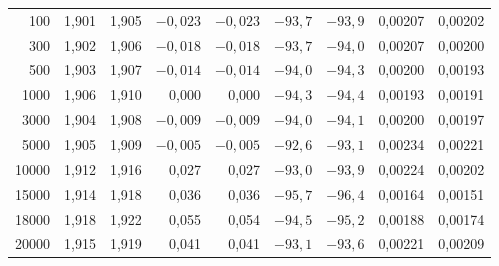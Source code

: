 \begin{table}[H]
\begin{tabular}{@{}r rr rr rr rr@{}}
    100             & 1,901                                   & 1,905                                    & $-0,023$                                & $-0,023$                                & $-93,7$    & $-93,9$    & 0,00207    & 0,00202    \\
    300             & 1,902                                   & 1,906                                    & $-0,018$                                & $-0,018$                                & $-93,7$    & $-94,0$    & 0,00207    & 0,00200    \\
    500             & 1,903                                   & 1,907                                    & $-0,014$                                & $-0,014$                                & $-94,0$    & $-94,3$    & 0,00200    & 0,00193    \\
    1000            & 1,906                                   & 1,910                                    & 0,000                                   & 0,000                                   & $-94,3$    & $-94,4$    & 0,00193    & 0,00191    \\
    3000            & 1,904                                   & 1,908                                    & $-0,009$                                & $-0,009$                                & $-94,0$    & $-94,1$    & 0,00200    & 0,00197    \\
    5000            & 1,905                                   & 1,909                                    & $-0,005$                                & $-0,005$                                & $-92,6$    & $-93,1$    & 0,00234    & 0,00221    \\
    10000           & 1,912                                   & 1,916                                    & 0,027                                   & 0,027                                   & $-93,0$    & $-93,9$    & 0,00224    & 0,00202    \\
    15000           & 1,914                                   & 1,918                                    & 0,036                                   & 0,036                                   & $-95,7$    & $-96,4$    & 0,00164    & 0,00151    \\
    18000           & 1,918                                   & 1,922                                    & 0,055                                   & 0,054                                   & $-94,5$    & $-95,2$    & 0,00188    & 0,00174    \\
    20000           & 1,915                                   & 1,919                                    & 0,041                                   & 0,041                                   & $-93,1$    & $-93,6$    & 0,00221    & 0,00209    \\
    \bottomrule
  \end{tabular}
\end{table}

